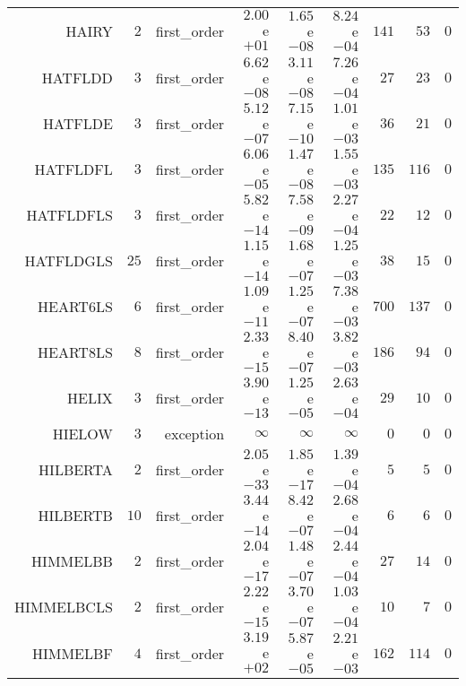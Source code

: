\begin{longtable}{rrrrrrrrr}
HAIRY & \(     2\) & first\_order & \( 2.00\)e\(+01\) & \( 1.65\)e\(-08\) & \( 8.24\)e\(-04\) & \(   141\) & \(    53\) & \(     0\) \\
HATFLDD & \(     3\) & first\_order & \( 6.62\)e\(-08\) & \( 3.11\)e\(-08\) & \( 7.26\)e\(-04\) & \(    27\) & \(    23\) & \(     0\) \\
HATFLDE & \(     3\) & first\_order & \( 5.12\)e\(-07\) & \( 7.15\)e\(-10\) & \( 1.01\)e\(-03\) & \(    36\) & \(    21\) & \(     0\) \\
HATFLDFL & \(     3\) & first\_order & \( 6.06\)e\(-05\) & \( 1.47\)e\(-08\) & \( 1.55\)e\(-03\) & \(   135\) & \(   116\) & \(     0\) \\
HATFLDFLS & \(     3\) & first\_order & \( 5.82\)e\(-14\) & \( 7.58\)e\(-09\) & \( 2.27\)e\(-04\) & \(    22\) & \(    12\) & \(     0\) \\
HATFLDGLS & \(    25\) & first\_order & \( 1.15\)e\(-14\) & \( 1.68\)e\(-07\) & \( 1.25\)e\(-03\) & \(    38\) & \(    15\) & \(     0\) \\
HEART6LS & \(     6\) & first\_order & \( 1.09\)e\(-11\) & \( 1.25\)e\(-07\) & \( 7.38\)e\(-03\) & \(   700\) & \(   137\) & \(     0\) \\
HEART8LS & \(     8\) & first\_order & \( 2.33\)e\(-15\) & \( 8.40\)e\(-07\) & \( 3.82\)e\(-03\) & \(   186\) & \(    94\) & \(     0\) \\
HELIX & \(     3\) & first\_order & \( 3.90\)e\(-13\) & \( 1.25\)e\(-05\) & \( 2.63\)e\(-04\) & \(    29\) & \(    10\) & \(     0\) \\
HIELOW & \(     3\) & exception & \(\infty\) & \(\infty\) & \(\infty\) & \(     0\) & \(     0\) & \(     0\) \\
HILBERTA & \(     2\) & first\_order & \( 2.05\)e\(-33\) & \( 1.85\)e\(-17\) & \( 1.39\)e\(-04\) & \(     5\) & \(     5\) & \(     0\) \\
HILBERTB & \(    10\) & first\_order & \( 3.44\)e\(-14\) & \( 8.42\)e\(-07\) & \( 2.68\)e\(-04\) & \(     6\) & \(     6\) & \(     0\) \\
HIMMELBB & \(     2\) & first\_order & \( 2.04\)e\(-17\) & \( 1.48\)e\(-07\) & \( 2.44\)e\(-04\) & \(    27\) & \(    14\) & \(     0\) \\
HIMMELBCLS & \(     2\) & first\_order & \( 2.22\)e\(-15\) & \( 3.70\)e\(-07\) & \( 1.03\)e\(-04\) & \(    10\) & \(     7\) & \(     0\) \\
HIMMELBF & \(     4\) & first\_order & \( 3.19\)e\(+02\) & \( 5.87\)e\(-05\) & \( 2.21\)e\(-03\) & \(   162\) & \(   114\) & \(     0\) \\

\end{longtable}
